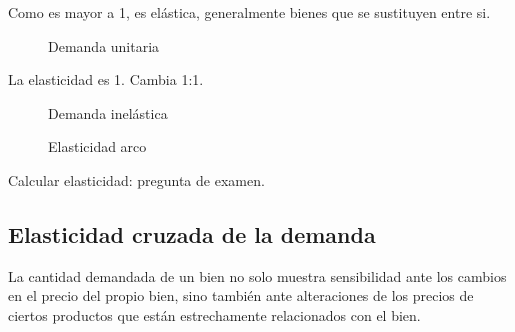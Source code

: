 Como es mayor a 1, es elástica, generalmente bienes que se sustituyen entre si.

\begin{figure}[h!]
    \centering
    \caption{Demanda unitaria}
\end{figure}

La elasticidad es 1. Cambia 1:1.

\begin{figure}[h!]
    \centering
    \caption{Demanda inelástica}
\end{figure}

\begin{figure}[h!]
    \centering
    \caption{Elasticidad arco}
\end{figure}

Calcular elasticidad: pregunta de examen.

\subsection{Elasticidad cruzada de la demanda}

La cantidad demandada de un bien no solo muestra sensibilidad ante los cambios en el precio del propio bien,
sino también ante alteraciones de los precios de ciertos productos que están estrechamente relacionados con el bien.

